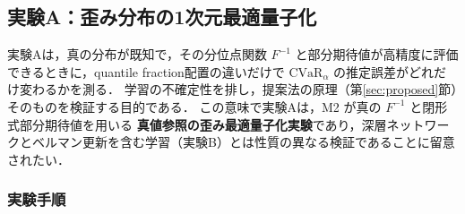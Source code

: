 \documentclass[a4paper,10pt]{jsarticle}
\theoremstyle{definition}
\newcommand{\CVaR}{\mathrm{CVaR}}
\newcommand{\Finv}{F^{-1}}
\begin{document}
\subsection{実験A：歪み分布の1次元最適量子化}
\label{subsec:expA}
実験Aは，真の分布が既知で，その分位点関数 $\Finv$ と部分期待値が高精度に評価できるときに，quantile fraction配置の違いだけで $\CVaR_\alpha$ の推定誤差がどれだけ変わるかを測る．
学習の不確定性を排し，提案法の原理（第\ref{sec:proposed}節）そのものを検証する目的である．
この意味で実験Aは，M2 が真の $\Finv$ と閉形式部分期待値を用いる \textbf{真値参照の歪み最適量子化実験}であり，深層ネットワークとベルマン更新を含む学習（実験B）とは性質の異なる検証であることに留意されたい．

\subsubsection{実験手順}
\end{document}
